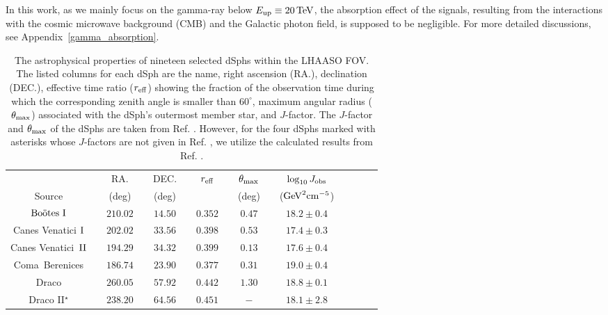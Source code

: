 \documentclass[12pt,aps,prd,amsmath,amssymb,showpacs,floats,floatfix,nofootinbib]{revtex4-1}
\def\red#1{{\textcolor{red}{#1}}} %
\def\TeV{\mathrm{TeV}} %
\def\GeV{\mathrm{GeV}} %
\begin{document}
In this work, as we mainly focus on the gamma-ray below $E_{\rm up}\equiv20\,\TeV$, the absorption effect of the signals, resulting from the interactions with the cosmic microwave background (CMB) and the Galactic photon field, is supposed to be negligible. For more detailed discussions, see Appendix~\ref{gamma_absorption}.

\begin{table}
\caption{\label{Table:dsphs}The astrophysical properties of nineteen selected dSphs within the LHAASO FOV.
The listed columns for each dSph are the name, right ascension (RA.), declination (DEC.),
effective time ratio ($r_{\rm eff}$) showing the fraction of the observation time during which the corresponding zenith angle is smaller than $60^\circ$,
maximum angular radius ($\rm \theta_{max}$) associated with the dSph's outermost member star,
and $J$-factor.
The $J$-factor and $\rm \theta_{max}$ of the dSphs are taken from Ref. \cite{Geringer-Sameth:2014yza}. However, for the four dSphs marked with asterisks whose $J$-factors are not given in Ref. \cite{Geringer-Sameth:2014yza}, we utilize the calculated results from Ref. \cite{Hutten:2016jko}.}
\small\centering
\begin{tabular}{ccccccccccccccc} \hline \hline
              &&
          RA. &&
          DEC.&&
          $r_{\rm eff}$&&
          $\theta_{\rm max}$&&
          $\log_{10}J_{\rm obs}$&&\\
		
       Source&&
		(deg)&&
		(deg)&&
		     &&
		(deg)&&
		($\GeV^{2}\rm cm^{-5}$)\\\hline


		$\rm Bo\ddot{o}tes ~I$&&
		$210.02$&&
		$14.50$&&
		$0.352$&&
		$0.47$&&	
		$18.2\pm0.4$\\
		
		
		Canes Venatici $\rm I$&&
		$202.02$&&
		$33.56$&&
		$0.398$&&
		$0.53$&&
		$17.4\pm0.3$\\
		
		Canes Venatici~$\rm II$&&
		$194.29$&&
		$34.32$&&
		$0.399$&&
		$0.13$&&
		$17.6\pm0.4$\\
		
		Coma~Berenices&&
		$186.74$&&
		$23.90$&&
		$0.377$&&
		$0.31$&&
		$19.0\pm0.4$\\
		
		Draco&&
		$260.05$&&
		$57.92$&&
		$0.442$&&
		$1.30$&&
		$18.8\pm0.1$\\

		Draco II$^{\star}$&&
		$238.20$&&
		$64.56$&&
		$0.451$&&
		$-$&&
		$18.1\pm2.8$\\
		

\end{tabular}
\end{table}
\end{document}
